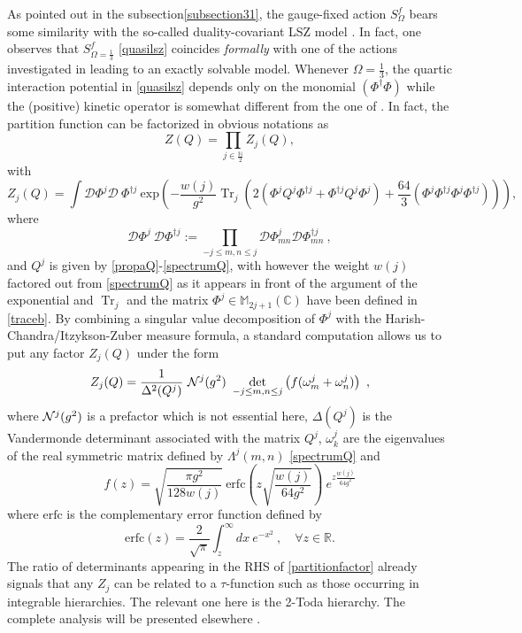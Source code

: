 \documentclass[a4paper,11pt,twoside]{article}
\numberwithin{equation}{section}
\DeclareMathOperator{\tr}{Tr}
\theoremstyle{nonumberplain}
\newcounter{and}
\begin{document}
As pointed out in the subsection\ref{subsection31}, the gauge-fixed action $S^f_{\Omega}$ bears some similarity with the so-called duality-covariant LSZ model \cite{LSZ}. In fact, one observes that $S^f_{\Omega=\frac{1}{3}}$ \eqref{quasilsz} coincides {\it{formally}} with one of the actions investigated in \cite{LSZ} leading to an exactly solvable model. Whenever $\Omega=\frac{1}{3}$, the quartic interaction potential in \eqref{quasilsz} depends only on the monomial $(\Phi^\dag\Phi)$ while the (positive) kinetic operator is somewhat different from the one of \cite{LSZ}. In fact, the partition function can be factorized in obvious notations as
%
\begin{equation}
Z(Q) =\prod_{j\in\frac{\mathbb{N}}{2}} Z_j(Q), \label{zq}
\end{equation}
with
\begin{equation}
Z_j(Q) =\int{\mathcal{D}} \Phi^j \mathcal{D} \ \Phi^{\dag j} \ \text{exp}\left(-\frac{w(j)}{g^2}\tr_j \left( 2 \left(\Phi^j Q^j\Phi^{\dag j}+\Phi^{\dag j} Q^j\Phi^j\right)+\frac{64}{3}\left(\Phi^j\Phi^{\dag j}\Phi^j\Phi^{\dag j}\right) \right)\right), \label{zqj}
\end{equation}
%
where%
%
\begin{equation}
\mathcal{D} \Phi^j \ \mathcal{D} \Phi^{\dag j} := \prod_{-j\le m,n\le j} \mathcal{D} \Phi^j_{mn} \mathcal{D} \Phi^{\dag j}_{mn} \ , \label{measure}
\end{equation}
%
and $Q^j$ is given by \eqref{propaQ}-\eqref{spectrumQ}, with however the weight $w(j)$ factored out from \eqref{spectrumQ} as it appears in front of the argument of the exponential and $\tr_j$ and the matrix $\Phi^j\in\mathbb{M}_{2j+1}(\mathbb{C})$ have been defined in \eqref{traceb}. By combining a singular value decomposition of $\Phi^j$ with the Harish-Chandra/Itzykson-Zuber measure formula, a standard computation  allows us to put any factor $Z_j(Q)$ under the form
\begin{equation}
Z_j(Q) = \frac{1}{\Delta^2(Q^j)} \ {\cal{N}}^j(g^2) \ \det_{-j\le m,n\le j} \left(f(\omega^j_m+\omega^j_n)\right) \ , \label{partitionfactor}
\end{equation}
where ${\cal{N}}^j(g^2)$ is a prefactor which is not essential here, $\Delta(Q^j)$ is the Vandermonde determinant associated with the matrix $Q^j$, $\omega^j_k$ are the eigenvalues of the real symmetric matrix defined by $\Lambda^j(m,n)$ \eqref{spectrumQ} and
\begin{equation}
f(z) = \sqrt{\frac{\pi g^2}{128w(j)}}\ \text{erfc}(z\sqrt{\frac{w(j)}{64g^2}})\ e^{z\frac{w(j)}{64g^2}}\label{functionspect}
\end{equation}
where
${\text{erfc}}$ is the complementary error function defined by%
%
\begin{equation}
\text{erfc}(z) = \frac{2}{\sqrt{\pi}} \int_z^\infty dx \ e^{-x^2} \ , \quad \forall z \in \mathbb{R}.
\end{equation}
The ratio of determinants appearing in the RHS of \eqref{partitionfactor} already signals that any $Z_j$ can be related to a $\tau$-function such as those occurring in integrable hierarchies. The relevant one here is the 2-Toda hierarchy. The complete analysis will be presented elsewhere \cite{solvab-15}. 
\end{document}
